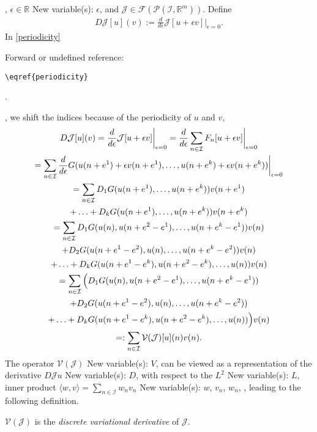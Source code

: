 \documentclass[runningheads]{llncs}
\newcommand{\1}{\chi}
\begin{document}
, \(\epsilon 
\in\mathbb{R}\)
{\color{blue} New variable(s): \(\epsilon\),  }
 and \(\mathcal{J}\in\mathcal{F}(\mathcal{P}(\mathcal{I},\mathbb{R}^m))\). Define
\begin{gather*}
	D\mathcal{J}[u](v):=\frac{d}{d\epsilon}\mathcal{J}[u+\epsilon v]\bigg|_{\epsilon=0}.
\end{gather*}
In \eqref{periodicity}
 {\color{red} Forward or undefined reference: \begin{verbatim}\eqref{periodicity}\end{verbatim}.}
, we shift the indices because of the periodicity of \(u\) and \(v\),
\begin{gather}
	\notag	D\mathcal{J}[u](v)=\frac{d}{d\epsilon}\mathcal{J}[u+\epsilon v]\bigg|_{\epsilon=0}=\frac{d}{d\epsilon}\sum_{n\in\mathcal{I}}F_n[u+\epsilon v]\bigg|_{\epsilon=0}\\
	\notag	=\sum_{n\in\mathcal{I}}\frac{d}{d\epsilon}G(u(n+e^1)+\epsilon v(n+e^1),\ldots,u(n+e^k)+\epsilon v(n+e^k))\bigg|_{\epsilon=0}\\
	\notag	=\sum_{n\in\mathcal{I}}D_1G(u(n+e^1),\ldots,u(n+e^k))v(n+e^1)\\
	\notag	+\ldots+D_kG(u(n+e^1),\ldots,u(n+e^k))v(n+e^k)\\
	\label{periodicity}	=\sum_{n\in\mathcal{I}}D_1G(u(n),u(n+e^2-e^1),\ldots,u(n+e^k-e^1))v(n)\\
	\notag	+D_2G(u(n+e^1-e^2),u(n),\ldots,u(n+e^k-e^2))v(n)\\
	\notag	+\ldots+D_kG(u(n+e^1-e^k),u(n+e^2-e^k),\ldots,u(n))v(n)\\
	\notag	=\sum_{n\in\mathcal{I}}\Big(D_1G(u(n),u(n+e^2-e^1),\ldots,u(n+e^k-e^1))\\
	\notag	+D_2G(u(n+e^1-e^2),u(n),\ldots,u(n+e^k-e^2))\\
	\notag	+\ldots+D_kG(u(n+e^1-e^k),u(n+e^2-e^k),\ldots,u(n))\Big)v(n)\\
	\notag	=:\sum_{n\in\mathcal{I}}\mathcal{V}(\mathcal{J})[u](n)v(n).	
\end{gather}
The operator \(\mathcal{V}(\mathcal{J})\)
{\color{blue} New variable(s): \(V\),  }
 can be viewed as a representation of the derivative \(D\mathcal{J}u\)
{\color{blue} New variable(s): \(D\),  }
 with respect to the \(L^2\)
{\color{blue} New variable(s): \(L\),  }
 inner product \(\langle w, v\rangle=\sum_{n\in \mathcal{I}} w_n v_n\)
{\color{blue} New variable(s): \(w\), \(v_n\), \(w_n\),  }
, leading to the following definition.
\begin{definition}
	\(\mathcal{V}(\mathcal{J})\) is the \emph{discrete variational derivative} of \(\mathcal{J}\).
\end{definition}
\end{document}
